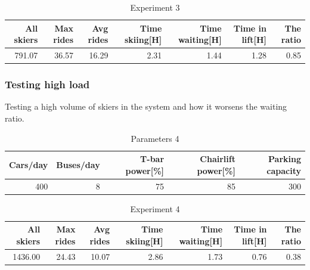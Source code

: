 \documentclass[11pt,a4paper]{article}
\begin{document}
\begin{table}[H]
    \centering
    \begin{tabular}{|r|r|r|r|r|r|r|}
        \hline
        \textbf{All skiers} &\textbf{Max rides} & \textbf{Avg rides} 
            & Time skiing[H] & Time waiting[H] & Time in lift[H]
            & \textbf{The ratio} \\ \hline

        791.07 & 36.57 & 16.29 & 2.31 & 1.44 & 1.28 & 0.85  \\ \hline
    \end{tabular}

    \caption{Experiment 3}
    \label{table:experiment3}
\end{table}

\subsubsection{Testing high load}
Testing a high volume of skiers in the system and how it worsens the waiting ratio.
\begin{table}[H]
		\centering
		\begin{tabular}{|r|r|r|r|r|}
			\hline
			\textbf{Cars/day} &\textbf{Buses/day} & \textbf{T-bar power[\%]} 
				& \textbf{Chairlift power[\%]} & \textbf{Parking capacity} \\ \hline

			 400 & 8 & 75 & 85& 300\\ \hline
		\end{tabular}

		\caption{Parameters 4}
		\label{table:param4}
	\end{table}


\begin{table}[H]
    \centering
    \begin{tabular}{|r|r|r|r|r|r|r|}
        \hline
        \textbf{All skiers} &\textbf{Max rides} & \textbf{Avg rides} 
            & Time skiing[H] & Time waiting[H] & Time in lift[H]
            & \textbf{The ratio} \\ \hline

        1436.00 & 24.43 & 10.07 & 2.86 & 1.73 & 0.76 & 0.38  \\ \hline
    \end{tabular}

    \caption{Experiment 4}
    \label{table:experiment4}
\end{table}
\end{document}
